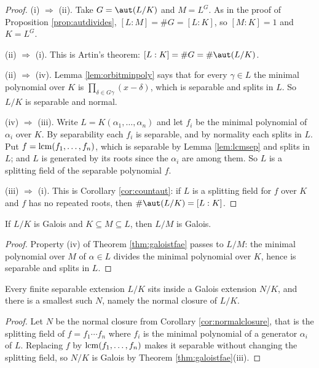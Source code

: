 \documentclass[a4paper]{scrartcl}
\begin{document}
\begin{proof}
	(i) $\Rightarrow$ (ii). Take $G = \aut(L/K)$ and $M = L^G$. As in the proof of Proposition \ref{prop:autdivides}, $[L:M] = \#G = [L:K]$, so $[M:K] = 1$ and $K = L^G$.

	(ii) $\Rightarrow$ (i). This is Artin's theorem: $[L:K] = \#G = \#\aut(L/K)$.

	(ii) $\Rightarrow$ (iv). Lemma \ref{lem:orbitminpoly} says that for every $\gamma \in L$ the minimal polynomial over $K$ is $\prod_{\delta \in G\gamma}(x - \delta)$, which is separable and splits in $L$. So $L/K$ is separable and normal.

	(iv) $\Rightarrow$ (iii). Write $L = K(\alpha_1,\dots,\alpha_n)$ and let $f_i$ be the minimal polynomial of $\alpha_i$ over $K$. By separability each $f_i$ is separable, and by normality each splits in $L$. Put $f = \operatorname{lcm}(f_1,\dots,f_n)$, which is separable by Lemma \ref{lem:lcmsep} and splits in $L$; and $L$ is generated by its roots since the $\alpha_i$ are among them. So $L$ is a splitting field of the separable polynomial $f$.

	(iii) $\Rightarrow$ (i). This is Corollary \ref{cor:countaut}: if $L$ is a splitting field for $f$ over $K$ and $f$ has no repeated roots, then $\#\aut(L/K) = [L:K]$.
\end{proof}

\begin{corollary}\label{cor:galoisintermediate}
	If $L/K$ is Galois and $K \subseteq M \subseteq L$, then $L/M$ is Galois.
\end{corollary}

\begin{proof}
	Property (iv) of Theorem \ref{thm:galoistfae} passes to $L/M$: the minimal polynomial over $M$ of $\alpha \in L$ divides the minimal polynomial over $K$, hence is separable and splits in $L$.
\end{proof}

\begin{corollary}\label{cor:galoisclosure}
	Every finite separable extension $L/K$ sits inside a Galois extension $N/K$, and there is a smallest such $N$, namely the normal closure of $L/K$.
\end{corollary}

\begin{proof}
	Let $N$ be the normal closure from Corollary \ref{cor:normalclosure}, that is the splitting field of $f = f_1\cdots f_n$ where $f_i$ is the minimal polynomial of a generator $\alpha_i$ of $L$. Replacing $f$ by $\operatorname{lcm}(f_1,\dots,f_n)$ makes it separable without changing the splitting field, so $N/K$ is Galois by Theorem \ref{thm:galoistfae}(iii).
\end{proof}
\end{document}
